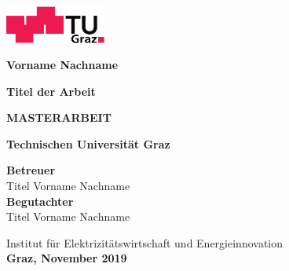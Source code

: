 %
%
%
%

\pagestyle{empty} \enlargethispage*{23cm}
	
\vspace*{-1.5cm}
\begin{center}
	\hspace*{-1.1cm}
	\includegraphics[width=3.3cm]{Abbildungen/TU_Graz_Logo.pdf}
			
	\vspace*{2cm}
	
	{\normalsize \textbf{Vorname Nachname\\}}
	

	\vspace*{1.5cm} \LARGE\textbf{Titel der Arbeit}\vspace*{1.5cm} \vfill
	
	
	\large{\textbf{MASTERARBEIT\\}} \vspace*{.7cm}

	\vspace*{0.7cm}{\normalsize zur Erlangung des akademischen Grades\\}

	\vspace*{1.5cm}{\normalsize eingereicht an der\\}
	\vspace*{0.7cm}\large{\textbf{Technischen Universität Graz\\}}
	
	\vspace*{1.5cm}\large{\textbf{Betreuer\\}}
	{\normalsize {}Titel Vorname Nachname\\}
	\large{\textbf{Begutachter\\}} %
	{\normalsize Titel Vorname Nachname\\} %
	
	\vspace*{0.7cm}
	\normalsize Institut für Elektrizitätswirtschaft und Energieinnovation\\
	
	\vspace*{2cm}\small{\textbf{Graz, November 2019\\}} \vspace*{.7cm}
	
\end{center}

\clearpage 